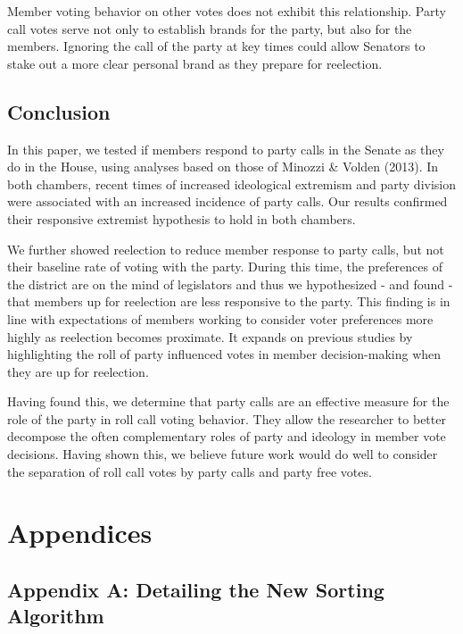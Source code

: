 \documentclass[12pt]{article}
\begin{document}
Member voting behavior on other votes does not exhibit this relationship. Party call votes serve not only to establish brands for the party, but also for the members. Ignoring the call of the party at key times could allow Senators to stake out a more clear personal brand as they prepare for reelection. 

\subsection{Conclusion}

In this paper, we tested if members respond to party calls in the Senate as they do in the House, using analyses based on those of Minozzi \& Volden (2013). In both chambers, recent times of increased ideological extremism and party division were associated with an increased incidence of party calls. Our results confirmed their responsive extremist hypothesis to hold in both chambers. 

We further showed reelection to reduce member response to party calls, but not their baseline rate of voting with the party. During this time, the preferences of the district are on the mind of legislators and thus we hypothesized - and found - that members up for reelection are less responsive to the party. This finding is in line with expectations of members working to consider voter preferences more highly as reelection becomes proximate. It expands on previous studies by highlighting the roll of party influenced votes in member decision-making when they are up for reelection. 

Having found this, we determine that party calls are an effective measure for the role of the party in roll call voting behavior. They allow the researcher to better decompose the often complementary roles of party and ideology in member vote decisions. Having shown this, we believe future work would do well to consider the separation of roll call votes by party calls and party free votes. 




\pagebreak

\section{Appendices}

\subsection{Appendix A: Detailing the New Sorting Algorithm}
\end{document}
